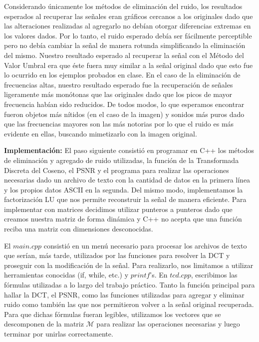 \documentclass[10pt, a4paper]{article}
\newcommand{\eme}{\mathcal{M}}
\begin{document}
\begin{itemize}
Considerando únicamente los métodos de eliminación del ruido, los resultados esperados al recuperar las señales eran gráficos cercanos a los originales dado que las alteraciones realizadas al agregarlo no debían otorgar diferencias extremas en los valores dados. Por lo tanto, el ruido esperado debía ser fácilmente perceptible pero no debía cambiar la señal de manera rotunda simplificando la eliminación del mismo.\newline
\newline
Nuestro resultado esperado al recuperar la señal con el Método del Valor Umbral era que éste fuera muy similar a la señal original dado que esto fue lo ocurrido en los ejemplos probados en clase. En el caso de la eliminación de frecuencias altas, nuestro resultado esperado fue la recuperación de señales ligeramente más monótonas que las originales dado que los picos de mayor frecuencia habían sido reducidos. De todos modos, lo que esperamos encontrar fueron objetos más nítidos (en el caso de la imagen) y sonidos más puros dado que las frecuencias mayores son las más notorias por lo que el ruido es más evidente en ellas, buscando mimetizarlo con la imagen original.\newline

\large{\textbf{Implementaci\'on:}}
El paso siguiente consistió en programar en C++ los métodos de eliminación y agregado de ruido utilizadas, la funci\'on de la Transformada Discreta del Coseno, el PSNR y el programa para realizar las operaciones necesarias dado un archivo de texto con la cantidad de datos en la primera línea y los propios datos ASCII en la segunda. Del mismo modo, implementamos la factorización LU que nos permite reconstruir la señal de manera eficiente. Para implementar con matrices decidimos utilizar punteros a punteros dado que creamos nuestra matriz de forma dinámica y C++ no acepta que una función reciba una matriz con dimensiones desconocidas.\newline
 
El $main.cpp$ consisti\'o en un men\'u necesario para procesar los archivos de texto que ser\'ian, m\'as tarde, utilizados por las funciones para resolver la DCT y proseguir con la modificación de la señal. Para realizarlo, nos limitamos a utilizar herramientas conocidas (if, while, etc.) y $printf$'s.\newline
En $tcd.cpp$, escribimos las f\'ormulas utilizadas a lo largo del trabajo pr\'actico. Tanto la funci\'on principal para hallar la DCT, el PSNR, como las funciones utilizadas para agregar y eliminar ruido como también las que nos permitieron volver a la señal original recuperada. Para que dichas f\'ormulas fueran legibles, utilizamos los vectores que se descomponen de la matriz $\eme$ para realizar las operaciones necesarias y luego terminar por unirlas correctamente. \newline


\end{itemize}
\end{document}
